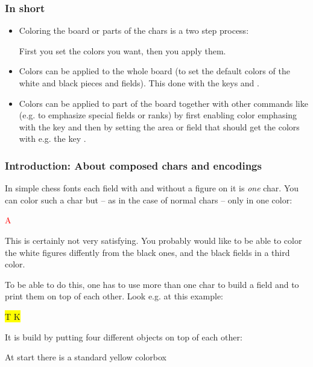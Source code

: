 \documentclass[pagesize,parskip=half-,fontsize=12pt]{scrartcl}
\newcommand\Chess[1][1cm]{\boardfont\fontsize{#1}{#1}\setboardfontsize{#1}\selectfont}
\begin{document}
\subsubsection{In short}

\begin{itemize}

\item Coloring the board or parts of the chars is a two step process:

First you set the colors you want, then you apply them.

\item
Colors can be applied to the whole board (to set the default colors
of the white and black pieces and fields). This done with the keys
 and .

\item Colors can be applied to part of the board together with other commands like 
 (e.g. to emphasize special fields or ranks)
by first enabling color emphasing with the key  and
then by setting the area or field that should get the colors with
e.g. the key .


\end{itemize}



\subsubsection{Introduction: About composed chars and encodings}
In simple chess fonts each field with and without a figure on it is
\emph{one} char. You can color such a char but -- as in the case of normal chars -- only
in one color:

\textcolor{red}{\Large A \BlackKingOnBlack}

This is certainly not very satisfying. You probably would like to be
able to color the white figures diffently from the black ones, and
the black fields in a third color.

To be able to do this, one has to use more than one char to build a
field and to print them on top of each other. Look e.g. at this
example:

 \colorbox{yellow}{\Chess
 \makebox[0pt][l]{\color{blue}\BlackEmptySquare}%
 \color{green}T%
 \color{red}K}

It is build by putting four different objects on top of each other:

At start there is a standard yellow colorbox
\end{document}
